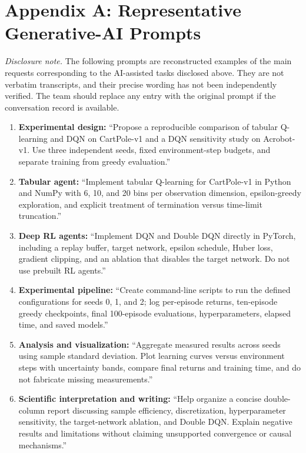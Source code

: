 \documentclass[a4paper,10pt,twocolumn]{article}
\begin{document}
\section*{Appendix A: Representative Generative-AI Prompts}
\noindent\textit{Disclosure note.} The following prompts are reconstructed examples of the main requests corresponding to the AI-assisted tasks disclosed above. They are not verbatim transcripts, and their precise wording has not been independently verified. The team should replace any entry with the original prompt if the conversation record is available.
\begin{enumerate}
\setlength{\itemsep}{1pt}
\setlength{\parskip}{0pt}
\item \textbf{Experimental design:} ``Propose a reproducible comparison of tabular Q-learning and DQN on CartPole-v1 and a DQN sensitivity study on Acrobot-v1. Use three independent seeds, fixed environment-step budgets, and separate training from greedy evaluation.''
\item \textbf{Tabular agent:} ``Implement tabular Q-learning for CartPole-v1 in Python and NumPy with 6, 10, and 20 bins per observation dimension, epsilon-greedy exploration, and explicit treatment of termination versus time-limit truncation.''
\item \textbf{Deep RL agents:} ``Implement DQN and Double DQN directly in PyTorch, including a replay buffer, target network, epsilon schedule, Huber loss, gradient clipping, and an ablation that disables the target network. Do not use prebuilt RL agents.''
\item \textbf{Experimental pipeline:} ``Create command-line scripts to run the defined configurations for seeds 0, 1, and 2; log per-episode returns, ten-episode greedy checkpoints, final 100-episode evaluations, hyperparameters, elapsed time, and saved models.''
\item \textbf{Analysis and visualization:} ``Aggregate measured results across seeds using sample standard deviation. Plot learning curves versus environment steps with uncertainty bands, compare final returns and training time, and do not fabricate missing measurements.''
\item \textbf{Scientific interpretation and writing:} ``Help organize a concise double-column report discussing sample efficiency, discretization, hyperparameter sensitivity, the target-network ablation, and Double DQN. Explain negative results and limitations without claiming unsupported convergence or causal mechanisms.''
\end{enumerate}
\end{document}
